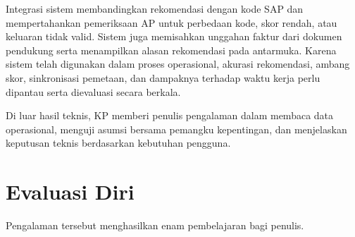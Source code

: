 Integrasi sistem membandingkan rekomendasi dengan kode SAP dan mempertahankan pemeriksaan AP untuk perbedaan kode, skor rendah, atau keluaran tidak valid. Sistem juga memisahkan unggahan faktur dari dokumen pendukung serta menampilkan alasan rekomendasi pada antarmuka. Karena sistem telah digunakan dalam proses operasional, akurasi rekomendasi, ambang skor, sinkronisasi pemetaan, dan dampaknya terhadap waktu kerja perlu dipantau serta dievaluasi secara berkala.

Di luar hasil teknis, KP memberi penulis pengalaman dalam membaca data operasional, menguji asumsi bersama pemangku kepentingan, dan menjelaskan keputusan teknis berdasarkan kebutuhan pengguna.

\section{Evaluasi Diri}
Pengalaman tersebut menghasilkan enam pembelajaran bagi penulis.
